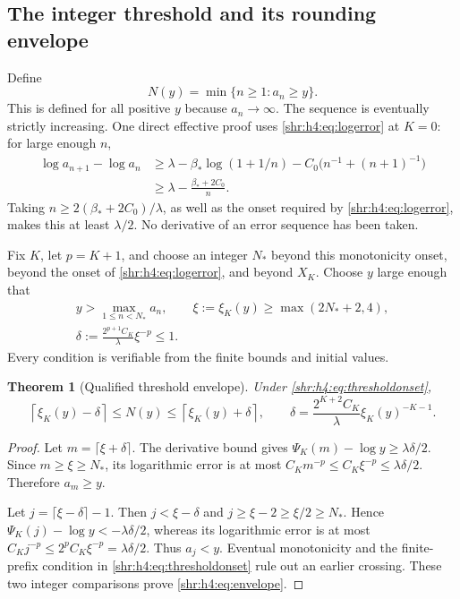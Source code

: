 \documentclass[11pt,letterpaper]{article}
\numberwithin{equation}{section}
\newtheorem{theorem}{Theorem}[section]
\theoremstyle{definition}
\newcommand{\1}{\mathbf 1}
\begin{document}
\subsection{The integer threshold and its rounding envelope}
Define
\begin{equation}
 N(y)=\min\{n\ge1:a_n\ge y\}.
 \label{shr:h4:eq:threshold}
\end{equation}
This is defined for all positive $y$ because $a_n\to\infty$.
The sequence is eventually strictly increasing. One direct effective
proof uses \eqref{shr:h4:eq:logerror} at $K=0$: for large enough $n$,
\begin{align*}
 \log a_{n+1}-\log a_n
 &\ge\lambda-\beta_*\log(1+1/n)
       -C_0\bigl(n^{-1}+(n+1)^{-1}\bigr)\\
 &\ge\lambda-\frac{\beta_*+2C_0}{n}.
\end{align*}
Taking $n\ge2(\beta_*+2C_0)/\lambda$, as well as the onset required by
\eqref{shr:h4:eq:logerror}, makes this at least $\lambda/2$. No derivative of
an error sequence has been taken.

Fix $K$, let $p=K+1$, and choose an integer $N_*$ beyond this monotonicity
onset, beyond the onset of \eqref{shr:h4:eq:logerror}, and beyond $X_K$.
Choose $y$ large enough that
\begin{equation}
 \begin{gathered}
 y>\max_{1\le n<N_*}a_n,\qquad \xi:=\xi_K(y)\ge\max(2N_*+2,4),\\
 \delta:=\frac{2^{p+1}C_K}{\lambda}\xi^{-p}\le1.
 \end{gathered}
 \label{shr:h4:eq:thresholdonset}
\end{equation}
Every condition is verifiable from the finite bounds and initial values.

\begin{theorem}[Qualified threshold envelope]
\label{shr:h4:thm:threshold}
Under \eqref{shr:h4:eq:thresholdonset},
\begin{equation}
 \left\lceil\xi_K(y)-\delta\right\rceil
 \le N(y)\le
 \left\lceil\xi_K(y)+\delta\right\rceil,
 \qquad
 \delta=\frac{2^{K+2}C_K}{\lambda}\xi_K(y)^{-K-1}.
 \label{shr:h4:eq:envelope}
\end{equation}
\end{theorem}
\begin{proof}
Let $m=\lceil\xi+\delta\rceil$. The derivative bound gives
$\Psi_K(m)-\log y\ge\lambda\delta/2$.
Since $m\ge\xi\ge N_*$, its logarithmic error is at most
$C_Km^{-p}\le C_K\xi^{-p}\le\lambda\delta/2$.
Therefore $a_m\ge y$.

Let $j=\lceil\xi-\delta\rceil-1$. Then $j<\xi-\delta$ and
$j\ge\xi-2\ge\xi/2\ge N_*$. Hence
$\Psi_K(j)-\log y<-\lambda\delta/2$, whereas its logarithmic error
is at most $C_Kj^{-p}\le2^pC_K\xi^{-p}=\lambda\delta/2$.
Thus $a_j<y$. Eventual monotonicity and the finite-prefix condition in
\eqref{shr:h4:eq:thresholdonset} rule out an earlier crossing. These two
integer comparisons prove \eqref{shr:h4:eq:envelope}.
\end{proof}
\end{document}
